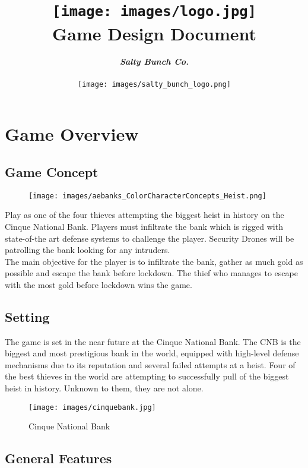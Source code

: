 \documentclass[10pt]{report}
\title{\texttt{[image: images/logo.jpg]}\\\textbf{Game Design Document}}
\author{\textbf{\textit{Salty Bunch Co.}}\\\\\texttt{[image: images/salty\_bunch\_logo.png]}}
\date{}
\begin{document}
\maketitle
\tableofcontents

\chapter{Game Overview}

\section{Game Concept}

\begin{figure}[H]
    \centering
    \texttt{[image: images/aebanks\_ColorCharacterConcepts\_Heist.png]}
    \caption{}
\end{figure}

Play as one of the four thieves attempting the biggest heist in history on the Cinque National Bank. Players must infiltrate the bank which is rigged with state-of-the art defense systems to challenge the player. Security Drones will be patrolling the bank looking for any intruders.\\
The main objective for the player is to infiltrate the bank, gather as much gold as possible and escape the bank before lockdown. The thief who manages to escape with the most gold before lockdown wins the game.

\section{Setting}

The game is set in the near future at the Cinque National Bank. The CNB is the biggest and most prestigious bank in the world, equipped with high-level defense mechanisms due to its reputation and several failed attempts at a heist. Four of the best thieves in the world are attempting to successfully pull of the biggest heist in history. Unknown to them, they are not alone.

\begin{figure}[H]
    \centering
    \texttt{[image: images/cinquebank.jpg]}
    \caption{Cinque National Bank}
\end{figure}

\section{General Features}
\end{document}
